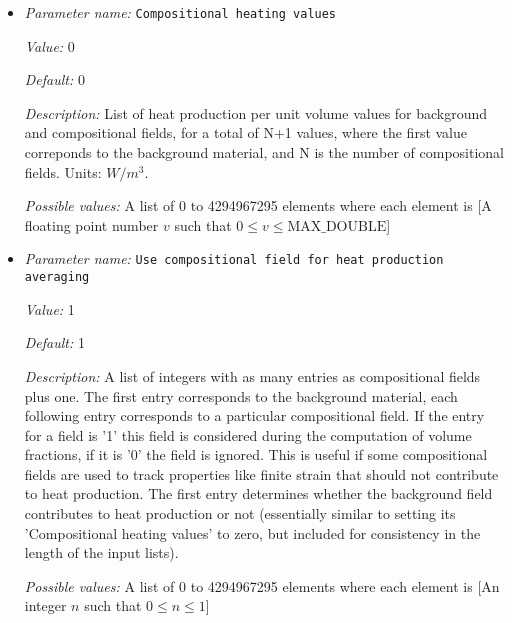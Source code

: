 \begin{itemize}
\item {\it Parameter name:} {\tt Compositional heating values}
\label{parameters:Heating model/Compositional heating/Compositional heating values}
\label{parameters:Heating_20model/Compositional_20heating/Compositional_20heating_20values}


{\it Value:} 0


{\it Default:} 0


{\it Description:} List of heat production per unit volume values for background and compositional fields, for a total of N+1 values, where the first value correponds to the background material, and N is the number of compositional fields. Units: $W/m^3$.


{\it Possible values:} A list of 0 to 4294967295 elements where each element is [A floating point number $v$ such that $0 \leq v \leq \text{MAX\_DOUBLE}$]
\item {\it Parameter name:} {\tt Use compositional field for heat production averaging}
\label{parameters:Heating model/Compositional heating/Use compositional field for heat production averaging}
\label{parameters:Heating_20model/Compositional_20heating/Use_20compositional_20field_20for_20heat_20production_20averaging}


{\it Value:} 1


{\it Default:} 1


{\it Description:} A list of integers with as many entries as compositional fields plus one. The first entry corresponds to the background material, each following entry corresponds to a particular compositional field. If the entry for a field is '1' this field is considered during the computation of volume fractions, if it is '0' the field is ignored. This is useful if some compositional fields are used to track properties like finite strain that should not contribute to heat production. The first entry determines whether the background field contributes to heat production or not (essentially similar to setting its 'Compositional heating values' to zero, but included for consistency in the length of the input lists).


{\it Possible values:} A list of 0 to 4294967295 elements where each element is [An integer $n$ such that $0\leq n \leq 1$]
\end{itemize}

